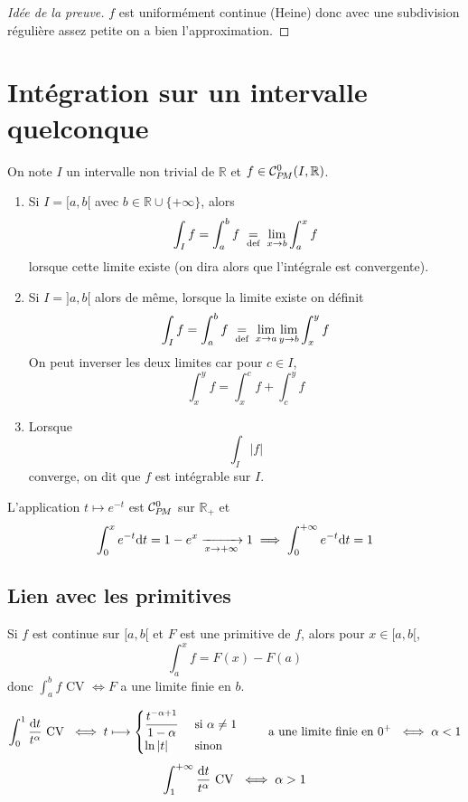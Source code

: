\begin{proof}[Idée de la preuve]
    $f$ est uniformément continue (Heine) donc avec une subdivision régulière assez petite on a bien l'approximation.
\end{proof}

\section{Intégration sur un intervalle quelconque}

On note $I$ un intervalle non trivial de $\mathbb R$ et $f\in\CPM(I, \mathbb R)$.

\begin{dfn}
    \begin{enumerate}
        \item Si $I=[a, b[$ avec $b\in\mathbb R\cup \{+\infty\}$, alors \[
                \int_If=\int_a^bf\;\underset{\text{def}}=\;\lim_{x\to b}\int_a^xf
            \]
            lorsque cette limite existe (on dira alors que l'intégrale est convergente).
        \item Si $I=]a, b[$ alors de même, lorsque la limite existe on définit \[
                \int_If=\int_a^bf\;\underset{\text{def}}=\; \lim_{x\to a}\lim_{y\to b}\int_x^yf
            \]
            On peut inverser les deux limites car pour $c\in I$, \[
                \int_x^yf=\int_x^cf+\int_c^yf
            \]
        \item Lorsque \[
                \int_I|f|
            \]
            converge, on dit que $f$ est intégrable sur $I$.
    \end{enumerate}
\end{dfn}

\begin{ex}
    L'application $t\longmapsto e^{-t}$ est $\CPM$ sur $\mathbb R_+$ et \[
        \int_0^x e^{-t}\mathrm{d} t=1-e^x\xrightarrow[x\to+\infty]{}1\implies \int_0^{+\infty}e^{-t}\mathrm{d} t=1
    \]
\end{ex}

\subsection{Lien avec les primitives}

Si $f$ est continue sur $[a, b[$ et $F$ est une primitive de $f$, alors pour $x\in[a, b[$, \[
    \int_a^xf=F(x)-F(a)
\]
donc $\int_a^b f$ CV $\iff F$ a une limite finie en $b$.

\begin{ex}
    \[
        \int_0^1\frac{\mathrm{d} t}{t^\alpha}\text{ CV }\iff t\longmapsto \begin{cases}
            \dfrac{t^{-\alpha+1}}{1-\alpha} &\text{ si }\alpha\neq 1\\\ln|t|&\text{ sinon }
        \end{cases}
        \qquad \text{ a une limite finie en $0^+$ }
        \iff \alpha<1
    \]
    \[
        \int_1^{+\infty}\frac{\mathrm{d} t}{t^\alpha}\text{ CV }\iff \alpha>1
    \]
\end{ex}

